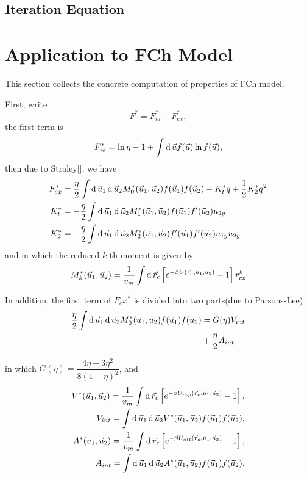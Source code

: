 \subsection{Iteration Equation}

\section{Application to FCh Model}
This section collects the concrete computation of properties of FCh model.


First, write
\begin{equation}
	F^*=F_{id}^*+F_{ex}^*,
\end{equation}
the first term is
\begin{equation}
	F_{id}^*=\ln\eta-1+\int\operatorname{d}\vec{u}f(\vec{u})\ln f(\vec{u}),
\end{equation}
then due to Straley[], we have
\begin{align}
	F_{ex}^*&=\frac{\eta}{2}\int\operatorname{d}\vec{u}_1\operatorname{d}\vec{u}_2M_0^*(\vec{u}_1,\vec{u}_2)f(\vec{u}_1)f(\vec{u}_2)-K_t^*q+\frac{1}{2}K_2^*q^2\\
	K_t^*&=-\frac{\eta}{2}\int\operatorname{d}\vec{u}_1\operatorname{d}\vec{u}_2M_1^*(\vec{u}_1,\vec{u}_2)f(\vec{u}_1)f'(\vec{u}_2)u_{2y}\\
	K_2^*&=-\frac{\eta}{2}\int\operatorname{d}\vec{u}_1\operatorname{d}\vec{u}_2M_2^*(\vec{u}_1,\vec{u}_2)f'(\vec{u}_1)f'(\vec{u}_2)u_{1y}u_{2y}\\
\end{align}
and in which the reduced $k$-th moment is given by
\begin{equation}
	M_k^*(\vec{u}_1,\vec{u}_2)=\frac{1}{v_m}\int\operatorname{d}\vec{r}_c\left[e^{-\beta U(\vec{r}_c,\vec{u}_1,\vec{u}_2)}-1\right]r_{cz}^k
\end{equation}

In addition, the first term of $F_ex^*$ is divided into two parts(due to Parsons-Lee)
\begin{equation}
	\begin{split}
	\frac{\eta}{2}\int\operatorname{d}\vec{u}_1\operatorname{d}\vec{u}_2M_0^*(\vec{u}_1,\vec{u}_2)f(\vec{u}_1)f(\vec{u}_2)&=G(\eta)V_{int}\\
	&+\frac{\eta}{2}A_{int}
	\end{split}
\end{equation}

in which $G(\eta)=\dfrac{4\eta-3\eta^2}{8(1-\eta)^2}$, and
\begin{align}
V^*(\vec{u}_1,\vec{u}_2)=\frac{1}{v_m}\int\operatorname{d}\vec{r}_c\left[e^{-\beta U_{rep}(\vec{r}_c,\vec{u}_1,\vec{u}_2)}-1\right],\\
V_{int} = \int\operatorname{d}\vec{u}_1\operatorname{d}\vec{u}_2V^*(\vec{u}_1,\vec{u}_2)f(\vec{u}_1)f(\vec{u}_2), \\
A^*(\vec{u}_1,\vec{u}_2)=\frac{1}{v_m}\int\operatorname{d}\vec{r}_c\left[e^{-\beta U_{att}(\vec{r}_c,\vec{u}_1,\vec{u}_2)}-1\right],\\
A_{int}=\int\operatorname{d}\vec{u}_1\operatorname{d}\vec{u}_2A^*(\vec{u}_1,\vec{u}_2)f(\vec{u}_1)f(\vec{u}_2).
\end{align}

